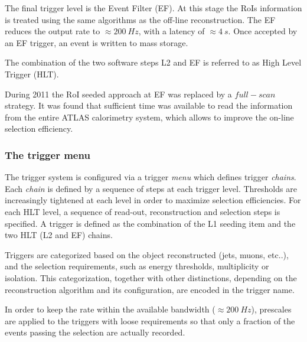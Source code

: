The final trigger level is the Event Filter (EF). At this stage the RoIs
information is treated using the same algorithms as the off-line
reconstruction. The EF reduces the output rate to $\approx{}200~Hz$, 
with a latency of $\approx{}4~s$. Once accepted by an EF trigger, an
event is written to mass storage.

The combination of the two software steps L2 and EF is referred to 
as High Level Trigger (HLT).

During 2011 the RoI seeded approach at EF was replaced by a
$full-scan$ strategy. It was found that sufficient time was available
to read the information from the entire ATLAS calorimetry system, 
which allows to improve the on-line selection efficiency.

\subsubsection{The trigger menu}

The trigger system is configured via a trigger \textit{menu} which defines trigger \textit{chains}.
Each \textit{chain} is defined by a sequence of steps at each trigger level.
Thresholds are increasingly tightened at each level in order to maximize selection efficiencies.
For each HLT level, a sequence of read-out, reconstruction and selection steps is specified.
A trigger is defined as the combination of the L1 seeding item and the two HLT (L2 and EF) chains.

Triggers are categorized based on the object reconstructed (jets, muons, etc..), 
and the selection requirements, such as energy thresholds, multiplicity or isolation.
This categorization, together with other distinctions, depending on the reconstruction algorithm
and its configuration, are encoded in the trigger name.

In order to keep the rate within the available bandwidth ($\approx{}200~Hz$), 
prescales are applied to the triggers with loose requirements so that
only a fraction of the events passing the selection are actually recorded.
